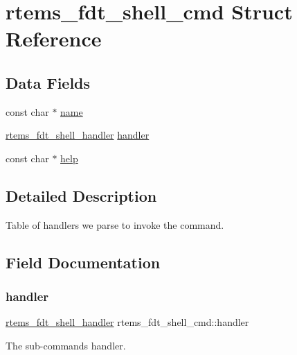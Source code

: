 \hypertarget{structrtems__fdt__shell__cmd}{}\section{rtems\+\_\+fdt\+\_\+shell\+\_\+cmd Struct Reference}
\label{structrtems__fdt__shell__cmd}
\subsection*{Data Fields}
\begin{DoxyCompactItemize}
\item 
const char $\ast$ \mbox{\hyperlink{structrtems__fdt__shell__cmd_a6e8ea4e5d060bf3867ae7c29f8c3e310}{name}}
\item 
\mbox{\hyperlink{rtems-fdt-shell_8c_a0189fbb9d9f8d895a991ff4e73cea6a8}{rtems\+\_\+fdt\+\_\+shell\+\_\+handler}} \mbox{\hyperlink{structrtems__fdt__shell__cmd_ac02448f8121631278ce737ef70870ba1}{handler}}
\item 
const char $\ast$ \mbox{\hyperlink{structrtems__fdt__shell__cmd_aa0b19fa1985da75b8c835cde512990ba}{help}}
\end{DoxyCompactItemize}


\subsection{Detailed Description}
Table of handlers we parse to invoke the command. 

\subsection{Field Documentation}
\mbox{\label{structrtems__fdt__shell__cmd_ac02448f8121631278ce737ef70870ba1}} 
\subsubsection{\texorpdfstring{handler}{handler}}
{\footnotesize\ttfamily \mbox{\hyperlink{rtems-fdt-shell_8c_a0189fbb9d9f8d895a991ff4e73cea6a8}{rtems\+\_\+fdt\+\_\+shell\+\_\+handler}} rtems\+\_\+fdt\+\_\+shell\+\_\+cmd\+::handler}

The sub-\/command\textquotesingle{}s handler. \mbox{\label{structrtems__fdt__shell__cmd_aa0b19fa1985da75b8c835cde512990ba}} 
